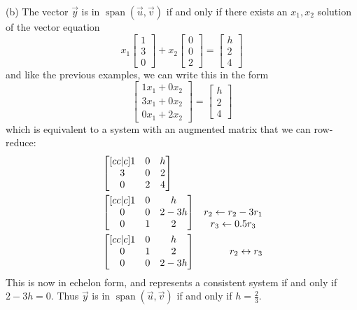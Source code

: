 \documentclass[11pt, letterpaper]{report}
\newenvironment{book}{}{}
\newcounter{example}[section]
\DeclareMathOperator{\spn}{span}
\newcommand{\bbbvec}[3]{
  \begin{bmatrix} #1 \\ #2 \\ #3 \end{bmatrix}
}
\begin{document}
\begin{book}
(b) The vector $\vec{y}$ is in $\spn(\vec{u},\vec{v})$ if and only if there exists an $x_1,x_2$ solution of the vector equation
\[x_1 \bbbvec{1}{3}{0} + x_2 \bbbvec{0}{0}{2} = \bbbvec{h}{2}{4}\]
and like the previous examples, we can write this in the form
\[\bbbvec{1x_1+0x_2}{3x_1+0x_2}{0x_1+2x_2} = \bbbvec{h}{2}{4}\]
which is equivalent to a system with an augmented matrix that we can row-reduce:
\begin{align*}
&\begin{bmatrix}[cc|c]
1 & 0 & h \\
3 & 0 & 2 \\
0 & 2 & 4
\end{bmatrix} \\
&\begin{bmatrix}[cc|c]
1 & 0 & h \\
0 & 0 & 2-3h \\
0 & 1 & 2
\end{bmatrix} &\begin{matrix} \rule{1em}{0pt} \\ r_2 \leftarrow r_2-3r_1 \\ r_3\leftarrow 0.5r_3\end{matrix} \\
&\begin{bmatrix}[cc|c]
1 & 0 & h \\
0 & 1 & 2 \\
0 & 0 & 2-3h
\end{bmatrix} &\begin{matrix} \rule{1em}{0pt} \\ r_2 \leftrightarrow r_3 \\ \rule{1em}{0pt}\end{matrix} 
\end{align*}
This is now in echelon form, and represents a consistent system if and only if $2-3h=0$. Thus $\vec{y}$ is in $\spn(\vec{u},\vec{v})$ if and only if $h=\frac{2}{3}$.


\end{book}
\end{document}

